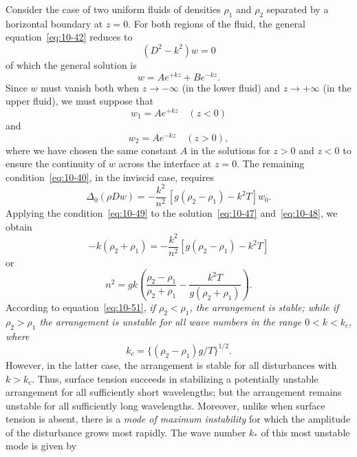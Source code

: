 Consider the case of two uniform fluids of densities $\rho_1$ and $\rho_2$ separated by a horizontal boundary at $z = 0$. For both regions of the fluid, the general equation~\eqref{eq:10-42} reduces to
\begin{equation}
\label{eq:10-45}
(D^2-k^2)w = 0
\end{equation}
of which the general solution is
\begin{equation}
\label{eq:10-46}
w = Ae^{+kz}+Be^{-kz}.
\end{equation}
Since $w$ must vanish both when $z \to -\infty$ (in the lower fluid) and $z \to +\infty$ (in the upper fluid), we must suppose that
\begin{equation}
\label{eq:10-47}
w_1 = Ae^{+kz} \quad (z < 0)
\end{equation}
and
\begin{equation}
\label{eq:10-48}
w_2 = Ae^{-kz} \quad (z > 0),
\end{equation}
where we have chosen the same constant $A$ in the solutions for $z > 0$ and $z < 0$ to ensure the continuity of $w$ across the interface at $z = 0$. The remaining condition~\eqref{eq:10-40}, in the inviscid case, requires
\begin{equation}
\label{eq:10-49}
\Delta_0(\rho Dw) = -\frac{k^2}{n^2}\,[g(\rho_2-\rho_1)-k^2T]w_0.
\end{equation}
Applying the condition~\eqref{eq:10-49} to the solution~\eqref{eq:10-47} and~\eqref{eq:10-48}, we obtain
\begin{equation}
\label{eq:10-50}
-k(\rho_2+\rho_1) = -\frac{k^2}{n^2}[g(\rho_2-\rho_1)-k^2T]
\end{equation}
or
\begin{equation}
\label{eq:10-51}
n^2 = gk\!\left(\frac{\rho_2-\rho_1}{\rho_2+\rho_1}-\frac{k^2T}{g(\rho_2+\rho_1)}\right)\!.
\end{equation}
According to equation~\eqref{eq:10-51}, \emph{if $\rho_2 < \rho_1$, the arrangement is stable; while if $\rho_2 > \rho_1$ the arrangement is unstable for all wave numbers in the range $0 < k < k_c$, where}
\begin{equation}
\label{eq:10-52}
k_c = \{(\rho_2-\rho_1)g/T\}^{1/2}.
\end{equation}
However, in the latter case, the arrangement is stable for all disturbances with $k > k_c$. Thus, surface tension succeeds in stabilizing a potentially unstable arrangement for all sufficiently short wavelengths; but the arrangement remains unstable for all sufficiently long wavelengths. Moreover, unlike when surface tension is absent, there is a \emph{mode of maximum instability} for which the amplitude of the disturbance grows most rapidly. The wave number $k_*$ of this most unstable mode is given by
